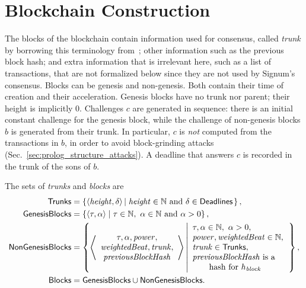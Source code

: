 \section{Blockchain Construction}\label{sec:blockchain_construction}

The blocks of the blockchain contain information used for consensus,
called \emph{trunk} by borrowing this terminology from~\cite{CohenP19};
other information such as the previous block hash;
and extra information that is irrelevant here, such as a list of transactions,
that are not formalized below since they are not used by Signum's consensus.
Blocks can be genesis and non-genesis. Both contain their time of creation and their acceleration.
Genesis blocks have no trunk nor parent; their height is implicitly $0$.
Challenges $c$ are generated in sequence: there is an initial constant challenge for the genesis
block, while the challenge of non-genesis blocks $b$ is generated from their trunk.
In particular, $c$ is \emph{not} computed from the transactions in $b$,
in order to avoid block-grinding attacks (Sec.~\ref{sec:prolog_structure_attacks}).
A deadline that answers $c$ is recorded in the trunk of the sons of $b$.
%
\begin{definition}\label{def:trunk}
  The sets of \emph{trunks} and \emph{blocks} are
  \begin{align*}
    \Trunks&=\left\{\langle\height,\delta\rangle\left|\;\height\in\mathbb{N}\text{ and }\delta\in\Deadlines\right.\right\},\\
    \GenesisBlocks&=\left\{\langle\tau,\alpha\rangle\mid\tau\in\mathbb{N},\ \alpha\in\mathbb{N}\text{ and }\alpha>0\right\},\\
    \NonGenesisBlocks&=\left\{\left\langle\begin{array}{c}
    \tau,\alpha,\power,\\
    \weightedbeat,\trunk,\\
    \previousblockhash
    \end{array}\right\rangle\left|\begin{array}{l}
    \tau,\alpha\in\mathbb{N},\ \alpha>0,\\
    \power,\weightedbeat\in\mathbb{N},\\
    \trunk\in\Trunks,\\
    \previousblockhash\text{ is a}\\
    \qquad\text{hash for $h_\block$}
    \end{array}\right.\right\},\\
    \Blocks&=\GenesisBlocks\cup\NonGenesisBlocks.
  \end{align*}
\end{definition}
